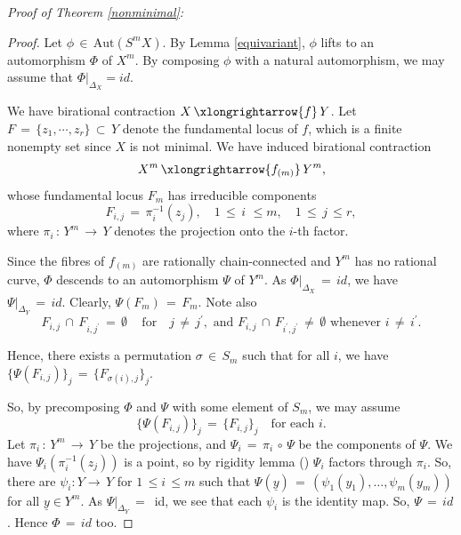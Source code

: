 \documentclass[12pt,reqno]{amsart}
\theoremstyle{definition}
\numberwithin{equation}{section}
\begin{document}
\textit{Proof of Theorem \ref{nonminimal}:}
\begin{proof}

Let $\phi\,\in\, \textrm{Aut}(S^{m}X)$.  By Lemma \ref{equivariant}, $\phi$ lifts to an automorphism $\Phi$ of $X^{m}$. By composing $\phi$ with a natural automorphism, we may assume that $\Phi|_{\Delta_X}= id$.

We have birational contraction $X\,\xlongrightarrow{f}\,Y$. Let $F\,=\,\{z_{1},\cdots,z_{r}\}\,\subset\,Y$ denote the fundamental locus of $f$, which is a finite nonempty set since $X$ is not minimal. We have induced birational contraction 
\begin{equation*}
X^{m}\,\xlongrightarrow{f_{(m)}}\, Y^{m},
\end{equation*}
whose fundamental locus $F_{m}$ has irreducible components 
\begin{equation*}
F_{i,j} \,=\, \pi_{i}^{-1}(z_{j}),\quad 1\,\leq\,i\,\,\leq m,  \quad 1\,\leq\,j\, \leq r, 
\end{equation*}
where $\pi_{i}\,:\, Y^{m}\,\longrightarrow\, Y$ denotes the projection onto the $i$-th factor. 

Since the fibres of $f_{(m)}$ are rationally chain-connected and $Y^m$ has no rational curve,  $\Phi$ descends to an automorphism $\Psi$ of $Y^{m}$. As $\Phi|_{\Delta_X}\,=\, id$, we have $\Psi|_{\Delta_Y}\,=\, id$. Clearly, $\Psi(F_{m})\,=\, F_{m}$. Note also
\begin{equation*}
F_{i,j}\,\cap\, F_{i,j^{\prime}}\,=\,\emptyset \,\quad\textrm{for}\quad j\,\neq\,j^{\prime}, \,\,\textrm{and}\,\,F_{i,j}\,\cap\, F_{i^{\prime}, j^{\prime}}\,\neq\, \emptyset\,\, \textrm{whenever}\,\, i\,\neq\, i^{\prime}.
\end{equation*}

Hence, there exists a permutation $\sigma\,\in\, S_{m}$ such that for all $i$, we have $\{\Psi(F_{i,j})\}_{j}\,=\,\{F_{\sigma(i),j}\}_{j}$.

So, by precomposing $\Phi$ and $\Psi$ with some element of $S_m$, we may assume
\begin{equation*}
\{\Psi(F_{i,j})\}_{j}\,=\, \{F_{i,j}\}_{j}\quad \textrm{for each}\,\, i.
\end{equation*}
Let $\pi_i\,:\, Y^{m}\,\longrightarrow\, Y$ be the projections, and $\Psi_{i}\,=\, \pi_{i}\,\circ\, \Psi$  be the components of $\Psi$. We have $\Psi_{i}(\pi^{-1}_{i}(z_{j}))$ is a point, so by rigidity lemma (\cite[Page 40]{Mum}) $\Psi_{i}$ factors through $\pi_{i}$. So, there are $\psi_{i}: Y\longrightarrow\, Y$ for $1\,\leq i\,\leq m$ such that $\Psi(\underline{y})\,=\,(\psi_{1}(y_{1}),\ldots, \psi_{m}(y_{m}))$ for all $\underline{y}\in Y^m$. As $\Psi|_{\Delta_Y}\,=\,$ id, we see that each $\psi_i$ is the identity map. So, $\Psi\,=\, id$. Hence $\Phi\,=\, id$ too.
\end{proof}
\end{document}
